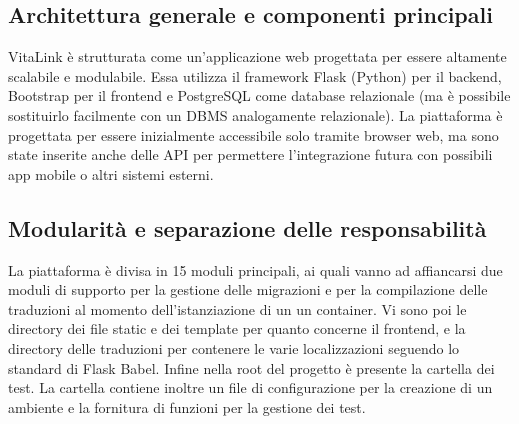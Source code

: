 \documentclass[12pt,a4paper,oneside]{report}
\begin{document}
\subsection{Architettura generale e componenti principali}
VitaLink è strutturata come un'applicazione web progettata per essere altamente scalabile e modulabile. Essa utilizza il framework Flask (Python) per il backend, Bootstrap per il frontend e PostgreSQL come database relazionale (ma è possibile sostituirlo facilmente con un DBMS analogamente relazionale).
La piattaforma è progettata per essere inizialmente accessibile solo tramite browser web, ma sono state inserite anche delle API per permettere l'integrazione futura con possibili app mobile o altri sistemi esterni.
\subsection{Modularità e separazione delle responsabilità}
La piattaforma è divisa in 15 moduli principali, ai quali vanno ad affiancarsi due moduli di supporto per la gestione delle migrazioni e per la compilazione delle traduzioni al momento dell'istanziazione di un un container.
Vi sono poi le directory dei file static e dei template per quanto concerne il frontend, e la directory delle traduzioni per contenere le varie localizzazioni seguendo lo standard di Flask Babel.
Infine nella root del progetto è presente la cartella dei test. La cartella contiene inoltre un file di configurazione per la creazione di un ambiente e la fornitura di funzioni per la gestione dei test.
\vspace{1em}
\end{document}
